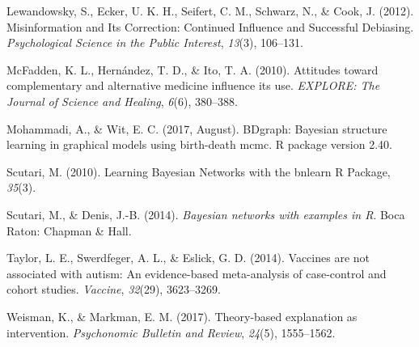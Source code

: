 \documentclass[10pt, letterpaper]{article}
\begin{document}
\hypertarget{ref-Lewandowsky2012}{}
Lewandowsky, S., Ecker, U. K. H., Seifert, C. M., Schwarz, N., \& Cook,
J. (2012). Misinformation and Its Correction: Continued Influence and
Successful Debiasing. \emph{Psychological Science in the Public
Interest}, \emph{13}(3), 106--131.

\hypertarget{ref-McFadden2010}{}
McFadden, K. L., Hernández, T. D., \& Ito, T. A. (2010). Attitudes
toward complementary and alternative medicine influence its use.
\emph{EXPLORE: The Journal of Science and Healing}, \emph{6}(6),
380--388.

\hypertarget{ref-Mohammadi2017}{}
Mohammadi, A., \& Wit, E. C. (2017, August). BDgraph: Bayesian structure
learning in graphical models using birth-death mcmc. R package version
2.40.

\hypertarget{ref-Scutari2010}{}
Scutari, M. (2010). Learning Bayesian Networks with the bnlearn R
Package, \emph{35}(3).

\hypertarget{ref-Scutari2014}{}
Scutari, M., \& Denis, J.-B. (2014). \emph{Bayesian networks with
examples in R}. Boca Raton: Chapman \& Hall.

\hypertarget{ref-Taylor2014}{}
Taylor, L. E., Swerdfeger, A. L., \& Eslick, G. D. (2014). Vaccines are
not associated with autism: An evidence-based meta-analysis of
case-control and cohort studies. \emph{Vaccine}, \emph{32}(29),
3623--3269.

\hypertarget{ref-Weisman2017}{}
Weisman, K., \& Markman, E. M. (2017). Theory-based explanation as
intervention. \emph{Psychonomic Bulletin and Review}, \emph{24}(5),
1555--1562.
\end{document}
